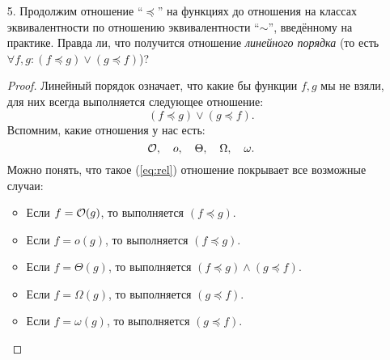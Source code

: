\begin{enumerate}
  \item[5.]
    Продолжим отношение ``$\preceq$'' на функциях до отношения на классах эквивалентности по отношению эквивалентности ``$\sim$'', введённому на практике. Правда ли, что получится отношение \textit{линейного порядка} (то есть
    $\forall f, g: (f \preceq g) \lor (g \preceq f)$)?
    \begin{proof}
      Линейный порядок означает, что какие бы функции $f, g$ мы не взяли, для них всегда выполняется следующее отношение:
      \begin{equation} \label{eq:rel}
        (f \preceq g) \lor (g \preceq f).
      \end{equation}
      Вспомним, какие отношения у нас есть:
      \begin{equation}
        \mathcal{O}, \quad o, \quad \Theta, \quad \Omega, \quad \omega.
      \end{equation}
      Можно понять, что такое (\ref{eq:rel}) отношение покрывает все возможные случаи:
      \begin{itemize}
        \item Если $f = \mathcal{O}(g)$, то выполняется $(f \preceq g)$.
        \item Если $f = o(g)$, то выполняется $(f \preceq g)$.
        \item Если $f = \Theta(g)$, то выполняется $(f \preceq g) \land (g \preceq f)$.
        \item Если $f = \Omega(g)$, то выполняется $(g \preceq f)$.
        \item Если $f = \omega(g)$, то выполняется $(g \preceq f)$.
      \end{itemize}
      
    \end{proof}


\end{enumerate}

